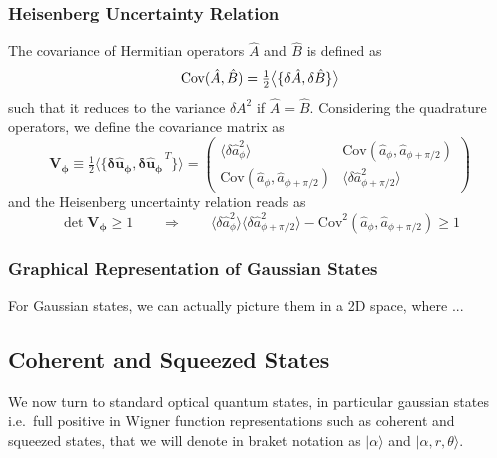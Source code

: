 \subsubsection{Heisenberg Uncertainty Relation }
The covariance of Hermitian operators \(\hat{A}\) and \(\hat{B}\) is defined as
\begin{equation}
    \mathrm{Cov}(\hat{A},\hat B) = \tfrac12 \big\langle \{ \delta\hat{A}, \delta\hat{B} \} \big\rangle \\
\end{equation}
such that it reduces to the variance $\delta A^2$ if $\hat{A}=\hat{B}$. Considering the quadrature operators, we define the covariance matrix as
\begin{equation}
\mathbf{V_\phi} \equiv \tfrac12 \big\langle \{  \mathbf{\delta \hat{u}_\phi},  \mathbf{\delta \hat{u}_\phi}^{\,T} \} \big\rangle
= \begin{pmatrix}
\langle \delta \hat{a}_\phi^2 \rangle &
\mathrm{Cov}(\hat{a}_\phi,\hat{a}_{\phi+\pi/2}) \\[4pt]
\mathrm{Cov}(\hat{a}_\phi,\hat{a}_{\phi+\pi/2})  &
\langle \delta \hat{a}_{\phi+\pi/2}^2 \rangle 
\end{pmatrix}
\end{equation}
and the Heisenberg uncertainty relation reads as
\begin{equation}
  \det \mathbf{V_\phi} \geq 1 \qquad \Rightarrow \qquad \langle  \delta \hat{a}^2_\phi \rangle \langle  \delta \hat{a}^2_{\phi+\pi/2} \rangle  - \mathrm{Cov}^2(\hat{a}_\phi,\hat{a}_{\phi+\pi/2})\geq 1
\end{equation}


\subsubsection{Graphical Representation of Gaussian States}
For Gaussian states, we can actually picture them in a 2D space, where ... 

\subsection{Coherent and Squeezed States}
We now turn to standard optical quantum states, in particular gaussian states i.e.\ full positive in Wigner function representations such as coherent and squeezed states, that we will denote in braket notation as $|\alpha\rangle$ and $|\alpha,r, \theta\rangle $.
